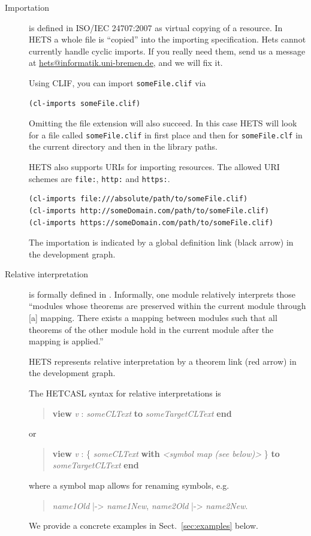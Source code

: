 \documentclass{article}
\newcommand{\normalTEXTSC}[2]{{#1\scriptsize#2}}
\newcommand     {\Hets}{\normalTEXTSC{H}{ETS}\xspace}
\newcommand{\HetCASL}{\normalTEXTSC{H}{ET}\normalTEXTSC{C}{ASL}\xspace}
\begin{document}
\begin{description}
\item[Importation] \label{descr:link_import}
  is defined in ISO/IEC 24707:2007 \cite{CommonLogic:oldfashioned} as virtual copying of a 
  resource. In \Hets a whole file is ``copied'' into the importing  
  specification. Hets cannot currently handle cyclic imports. If you really need
  them, send us a message at \href{mailto:hets@informatik.uni-bremen.de}{hets@informatik.uni-bremen.de}, and we will fix it.
  
  Using CLIF, you can import \texttt{someFile.clif} via
  \begin{lstlisting}[language=clif]
(cl-imports someFile.clif)
  \end{lstlisting}
  Omitting the file extension will also succeed. In this case \Hets will look 
  for a file called \texttt{someFile.clif} in first place and then for 
  \texttt{someFile.clf} in the current directory and then in the library paths.

  \Hets also supports URIs for importing resources. The allowed URI schemes are
  \texttt{file:}, \texttt{http:} and \texttt{https:}.
  \begin{lstlisting}[language=clif]
(cl-imports file:///absolute/path/to/someFile.clif)
(cl-imports http://someDomain.com/path/to/someFile.clif)
(cl-imports https://someDomain.com/path/to/someFile.clif)
  \end{lstlisting}

  The importation is indicated by a global definition link (black arrow) in the 
  development graph.

\item[Relative interpretation]
  is formally defined in \cite{colore-fois}.  Informally, one module relatively interprets those “modules whose theorems are preserved within the current module through [a] mapping. There exists a mapping between modules such that all theorems of the other module hold in the current module after the mapping is applied.” \cite{Colore-metadata}

  \Hets represents relative interpretation by a theorem link 
  (red arrow) in the development graph.

  The \HetCASL syntax for relative interpretations is
\begin{quote}
\textbf{view} \textit{v} : \textit{someCLText} \textbf{to} \textit{someTargetCLText}  \textbf{end}
\end{quote}
or
\begin{quote}
\textbf{view} \textit{v} : \{ \textit{someCLText} \textbf{with} \textit{<symbol map (see below)>} \} \textbf{to} \textit{someTargetCLText}  \textbf{end}
\end{quote}
  where a symbol map allows for renaming symbols, e.g.
\begin{quote}
\textit{name1Old} |-> \textit{name1New}, \textit{name2Old} |-> \textit{name2New}.
\end{quote}
  We provide a concrete examples in Sect.~\ref{sec:examples} below.
  

\end{description}
\end{document}
